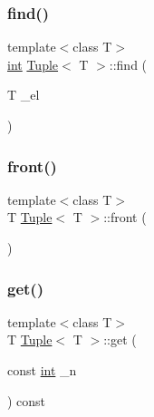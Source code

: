 \subsubsection{\texorpdfstring{find()}{find()}}
{\footnotesize\ttfamily template$<$class T$>$ \\
\mbox{\hyperlink{draw_8hh_aa620a13339ac3a1177c86edc549fda9b}{int}} \mbox{\hyperlink{class_tuple}{Tuple}}$<$ T $>$\+::find (\begin{DoxyParamCaption}\item[{T}]{\+\_\+el }\end{DoxyParamCaption})\hspace{0.3cm}{\ttfamily [inline]}}

\mbox{\label{class_tuple_a3f97540a70c1e40e3a34c1b5dee9fa0e}} 
\subsubsection{\texorpdfstring{front()}{front()}}
{\footnotesize\ttfamily template$<$class T$>$ \\
T \mbox{\hyperlink{class_tuple}{Tuple}}$<$ T $>$\+::front (\begin{DoxyParamCaption}{ }\end{DoxyParamCaption})\hspace{0.3cm}{\ttfamily [inline]}}

\mbox{\label{class_tuple_aabf82c5d0f19c9a8f6a8f01d95801162}} 
\subsubsection{\texorpdfstring{get()}{get()}\hspace{0.1cm}{\footnotesize\ttfamily [1/2]}}
{\footnotesize\ttfamily template$<$class T$>$ \\
T \mbox{\hyperlink{class_tuple}{Tuple}}$<$ T $>$\+::get (\begin{DoxyParamCaption}\item[{const \mbox{\hyperlink{draw_8hh_aa620a13339ac3a1177c86edc549fda9b}{int}}}]{\+\_\+n }\end{DoxyParamCaption}) const\hspace{0.3cm}{\ttfamily [inline]}}



